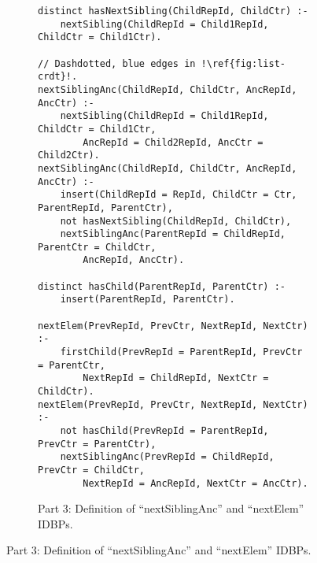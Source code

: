 \begin{figure}[htpb]\ContinuedFloat
	\centering

	\begin{subfigure}[b]{\textwidth}
		\begin{lstlisting}[keepspaces,escapechar=!]
distinct hasNextSibling(ChildRepId, ChildCtr) :-
    nextSibling(ChildRepId = Child1RepId, ChildCtr = Child1Ctr).

// Dashdotted, blue edges in !\ref{fig:list-crdt}!.
nextSiblingAnc(ChildRepId, ChildCtr, AncRepId, AncCtr) :-
    nextSibling(ChildRepId = Child1RepId, ChildCtr = Child1Ctr,
        AncRepId = Child2RepId, AncCtr = Child2Ctr).
nextSiblingAnc(ChildRepId, ChildCtr, AncRepId, AncCtr) :-
    insert(ChildRepId = RepId, ChildCtr = Ctr, ParentRepId, ParentCtr),
    not hasNextSibling(ChildRepId, ChildCtr),
    nextSiblingAnc(ParentRepId = ChildRepId, ParentCtr = ChildCtr,
        AncRepId, AncCtr).

distinct hasChild(ParentRepId, ParentCtr) :-
    insert(ParentRepId, ParentCtr).

nextElem(PrevRepId, PrevCtr, NextRepId, NextCtr) :-
    firstChild(PrevRepId = ParentRepId, PrevCtr = ParentCtr,
        NextRepId = ChildRepId, NextCtr = ChildCtr).
nextElem(PrevRepId, PrevCtr, NextRepId, NextCtr) :-
    not hasChild(PrevRepId = ParentRepId, PrevCtr = ParentCtr),
    nextSiblingAnc(PrevRepId = ChildRepId, PrevCtr = ChildCtr,
        NextRepId = AncRepId, NextCtr = AncCtr).\end{lstlisting}
		\caption{Part 3: Definition of ``nextSiblingAnc'' and ``nextElem'' \acp{IDBP}.}\label{code:list-crdt-datalog-dialect-part3}
	\end{subfigure}
\end{figure}

